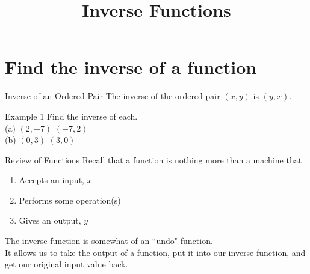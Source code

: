 \documentclass[t]{beamer}
\title{Inverse Functions}
\author{}
\date{}
\begin{document}
\section{Find the inverse of a function}

\begin{frame}{Inverse of an Ordered Pair}
The \alert{inverse} of the ordered pair $(x,y)$ is $(y,x)$.
\end{frame}

\begin{frame}{Example 1}
Find the inverse of each.	\newline\\
(a) \quad $(2,-7)$	\quad \pause $(-7,2)$	\newline\\	\pause
(b) \quad $(0,3)$ \quad \pause $(3,0)$
\end{frame}

\begin{frame}{Review of Functions}
Recall that a function is nothing more than a machine that	\newline\\
\begin{enumerate}
	\item Accepts an input, $x$	\newline\\	\pause
	\item Performs some operation(s)	\newline\\	\pause
	\item Gives an output, $y$	\newline\\	\pause
\end{enumerate}
The inverse function is somewhat of an {\color{blue}``undo"} function.	\newline\\	\pause
It allows us to take the output of a function, put it into our inverse function, and get our original input value back.
\end{frame}
\end{document}
